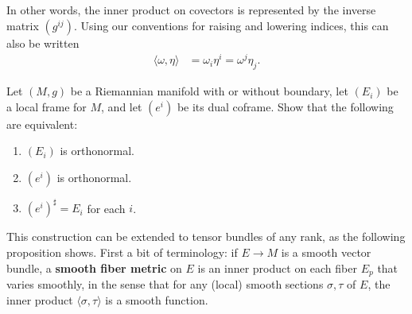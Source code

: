 In other words, the inner product on covectors is represented by the inverse matrix $(g^{ij})$. Using our conventions for raising and lowering indices, this can also be written
\begin{align*}
\langle\omega, \eta\rangle &= \omega_i\eta^i = \omega^j\eta_j.
\end{align*}

\begin{exercise}
\label{exer:orthonormal-frames-and-coframes}
Let $(M, g)$ be a Riemannian manifold with or without boundary, let $(E_i)$ be a local frame for $M$, and let $(e^i)$ be its dual coframe. Show that the following are equivalent:
\begin{enumerate}
\item[(a)] $(E_i)$ is orthonormal.
\item[(b)] $(e^i)$ is orthonormal.
\item[(c)] $(e^i)^{\sharp} = E_i$ for each $i$.
\end{enumerate}
\end{exercise}

This construction can be extended to tensor bundles of any rank, as the following proposition shows. First a bit of terminology: if $E \to M$ is a smooth vector bundle, a \textbf{smooth fiber metric} on $E$ is an inner product on each fiber $E_p$ that varies smoothly, in the sense that for any (local) smooth sections $\sigma, \tau$ of $E$, the inner product $\langle\sigma, \tau\rangle$ is a smooth function.

